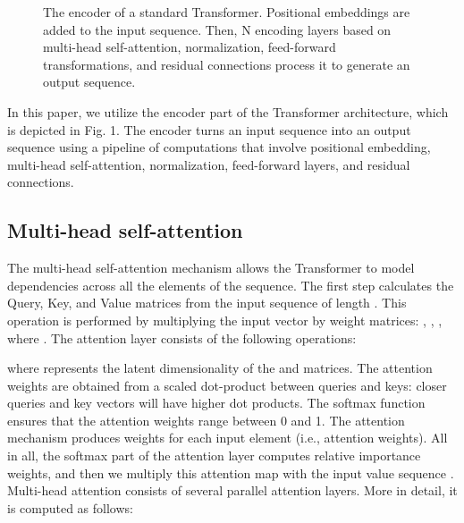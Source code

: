 \documentclass[lettersize,journal]{IEEEtran}
\begin{document}
\begin{figure}[t!]
\begin{center}
{
    }
    \end{center}
     


\caption{The encoder of a standard Transformer. Positional embeddings are added to the input sequence. Then, N encoding layers based on multi-head self-attention, normalization, feed-forward transformations, and residual connections process it to generate an output sequence.}
\end{figure}

In this paper, we utilize the encoder part of the Transformer architecture, which is depicted in Fig. 1. The encoder turns an input sequence   into an output sequence  using a pipeline of computations that involve positional embedding, multi-head self-attention, normalization, feed-forward layers, and residual connections.


\subsection{Multi-head self-attention}
The multi-head self-attention mechanism allows the Transformer to model dependencies across all the elements of the sequence. The first step calculates the Query, Key, and Value matrices from the input sequence  of length . This operation is performed by multiplying the input vector by weight matrices: , , , where . The attention layer consists of the following operations:

where  represents the latent dimensionality of the  and  matrices. The attention weights are obtained from a scaled dot-product between queries and keys: closer queries and key vectors will have higher dot products. The softmax function ensures that the attention weights range between 0 and 1. The attention mechanism produces  weights for each input element  (i.e.,  attention weights). All in all, the softmax part of the attention layer computes relative importance weights, and then we multiply this attention map with the input value sequence . 
Multi-head attention consists of several parallel attention layers. More in detail, it is computed as follows: 
\end{document}
